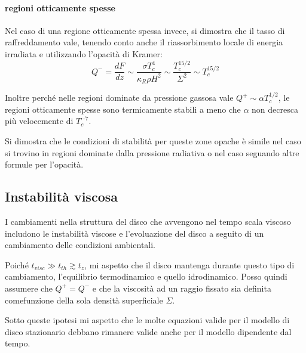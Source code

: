 \documentclass[a4paperbi]{article}
\begin{document}
	\paragraph{regioni otticamente spesse}
	Nel caso di una regione otticamente spessa invece, si dimostra che il tasso di raffreddamento vale, tenendo conto anche il riassorbimento locale di energia irradiata e utilizzando l'opacità di Kramer:
	\begin{equation}
		Q^-=\frac{dF}{dz}\sim\frac{\sigma T_c^4}{\kappa_R\rho H^2}\sim\frac{T_c^{15/2}}{\Sigma^2}\sim T_c^{15/2}
	\end{equation}
	
	Inoltre perché nelle regioni dominate da pressione gassosa vale $Q^+\sim \alpha T_c^{1/2}$, le regioni otticamente spesse sono termicamente stabili a meno che $\alpha$ non decresca più velocemente di $T_c^{-7}$.
	
	Si dimostra che le condizioni di stabilità per queste zone opache è simile nel caso si trovino in regioni dominate dalla pressione radiativa o nel caso seguando altre formule per l'opacità.

\subsection{Instabilità viscosa}
	I cambiamenti nella struttura del disco che avvengono nel tempo scala viscoso includono le instabilità viscose e l'evoluazione del disco a seguito di un cambiamento delle condizioni ambientali.
	
	Poiché $t_{visc}\gg t_{th}\gtrsim t_z$, mi aspetto che il disco mantenga durante questo tipo di cambiamento, l'equilibrio termodinamico e quello idrodinamico. Posso quindi assumere che $Q^+=Q^-$ e che la viscosità ad un raggio fissato sia definita comefunzione della sola densità superficiale $\Sigma$. 
	
	Sotto queste ipotesi mi aspetto che le molte equazioni valide per il modello di disco stazionario debbano rimanere valide anche per il modello dipendente dal tempo. 
	
\end{document}
